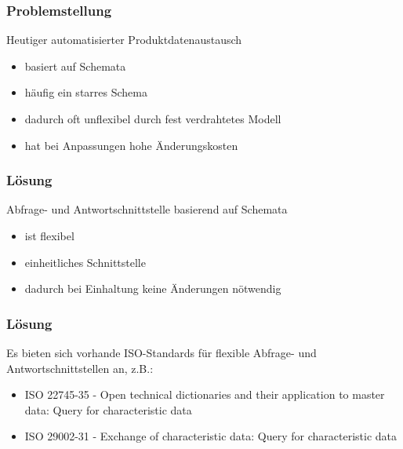 \documentclass[serif,mathserif]{beamer}
\begin{document}
\begin{frame}
  \frametitle{Problemstellung}
  Heutiger automatisierter Produktdatenaustausch\pause
  \begin{itemize}
  \item basiert auf Schemata\pause
  \item häufig ein starres Schema\pause
  \item dadurch oft unflexibel durch fest verdrahtetes Modell\pause 
  \item hat bei Anpassungen hohe Änderungskosten
  \end{itemize}
\end{frame}


\begin{frame}
  \frametitle{Lösung}
  Abfrage- und Antwortschnittstelle basierend auf Schemata\pause
  \begin{itemize}
  \item ist flexibel\pause
  \item einheitliches Schnittstelle\pause
  \item dadurch bei Einhaltung keine Änderungen nötwendig
  \end{itemize}
\end{frame}

\begin{frame}
  \frametitle{Lösung}
  Es bieten sich vorhande ISO-Standards für flexible Abfrage- und Antwortschnittstellen an, z.B.:\pause
  \begin{itemize}
  \item ISO 22745-35 - Open technical dictionaries and their application to master data: Query for characteristic data\pause
  \item ISO 29002-31 - Exchange of characteristic data: Query for characteristic data
  \end{itemize}
\end{frame}
\end{document}

